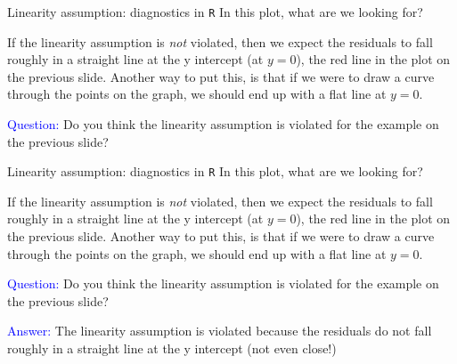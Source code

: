 \documentclass[10pt,t]{beamer}
\begin{document}
\begin{frame}{Linearity assumption: diagnostics in \texttt{R}}
In this plot, what are we looking for?

\vspace{0.3cm}

If the linearity assumption is \textit{not} violated, then we expect the residuals to fall roughly in a straight line at the y intercept (at $y = 0$), the red line in the plot on the previous slide. Another way to put this, is that if we were to draw a curve through the points on the graph, we should end up with a flat line at $y = 0$.

\vspace{0.3cm}

\textcolor{blue}{Question:} Do you think the linearity assumption is violated for the example on the previous slide?

\end{frame}

\begin{frame}{Linearity assumption: diagnostics in \texttt{R}}
In this plot, what are we looking for?

\vspace{0.3cm}

If the linearity assumption is \textit{not} violated, then we expect the residuals to fall roughly in a straight line at the y intercept (at $y = 0$), the red line in the plot on the previous slide. Another way to put this, is that if we were to draw a curve through the points on the graph, we should end up with a flat line at $y = 0$.

\vspace{0.3cm}

\textcolor{blue}{Question:} Do you think the linearity assumption is violated for the example on the previous slide?

\vspace{0.3cm}

\textcolor{blue}{Answer:} The linearity assumption is violated because the residuals do not fall roughly in a straight line at the y intercept (not even close!)

\end{frame}
\end{document}
